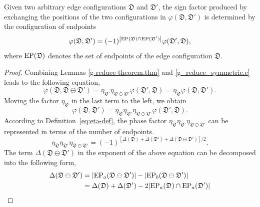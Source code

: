 \begin{theorem}\label{theorem:phi_exchange}
Given two arbitrary edge configurations $\mathfrak{D}$ and $\mathfrak{D}'$, the sign factor produced by exchanging the positions of the two configurations in $\varphi(\mathfrak{D},\mathfrak{D}')$ is determined by the configuration of endpoints
  \begin{equation}\label{eq:exchange-relation-phi}
      \varphi(\mathfrak{D},\mathfrak{D}')
  =
  (-1)^{\abs{\mathrm{EP}(\mathfrak{D})\cap \mathrm{EP}(\mathfrak{D}')}} \varphi(\mathfrak{D}',\mathfrak{D}),
  \end{equation}
  where $\mathrm{EP}(\mathfrak{D})$ denotes the set of endpoints of the edge configuration $\mathfrak{D}$.
\end{theorem}
\begin{proof}
  Combining Lemmas \ref{g-reduce-theorem.thm} and \ref{g_reduce_symmetric.e} leads to the following equation,
  \[
  \varphi(\mathfrak{D},\mathfrak{D}\ominus\mathfrak{D}') = 
  \eta_{\mathfrak{D}'}\eta_{\mathfrak{D}\ominus\mathfrak{D}'} \varphi(\mathfrak{D}',\mathfrak{D}) =
  \eta_{\mathfrak{D}}\varphi(\mathfrak{D},\mathfrak{D}').
  \]
  Moving the factor $\eta_\mathfrak{D}$ in the last term to the left, we obtain
  \begin{equation}\label{eq:eta-phi-relation}
      \varphi(\mathfrak{D},\mathfrak{D}') = \eta_{\mathfrak{D}}\eta_{\mathfrak{D}'}\eta_{\mathfrak{D}\ominus\mathfrak{D}'} \varphi(\mathfrak{D}',\mathfrak{D}) .
  \end{equation}
  According to Definition~\ref{eq:eta-def}, the phase factor $\eta_{\mathfrak{D}}\eta_{\mathfrak{D}'}\eta_{\mathfrak{D}\ominus\mathfrak{D}'}$ can be represented in terms of the number of endpoints.
  \begin{equation}\label{eq:eta-phi-proof-1}
      \eta_{\mathfrak{D}}\eta_{\mathfrak{D}'}\eta_{\mathfrak{D}\ominus\mathfrak{D}'}
  =
  (-1)^{[\Delta(\mathfrak{D}) + \Delta(\mathfrak{D}') + \Delta(\mathfrak{D}\ominus\mathfrak{D}')]/2}.
  \end{equation}
  The term $\Delta(\mathfrak{D}\ominus\mathfrak{D}')$ in the exponent of the above equation can be decomposed into the following form,
  \begin{align*}
      \Delta(\mathfrak{D}\ominus\mathfrak{D}') 
      &=
      \abs{\mrm{EP}_a(\mathfrak{D}\ominus\mathfrak{D}')} - \abs{\mrm{EP}_b(\mathfrak{D}\ominus\mathfrak{D}')} \\
      &= 
      \Delta(\mathfrak{D}) + \Delta(\mathfrak{D}') - 2\abs{\mrm{EP}_a(\mathfrak{D}) \cap \mrm{EP}_a(\mathfrak{D}')} \\

\end{align*}
\end{proof}
